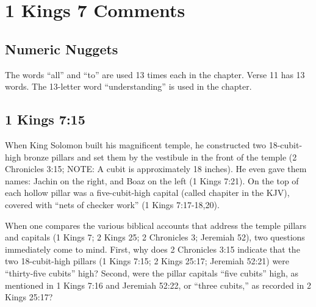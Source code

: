 \section{1 Kings 7 Comments}


\subsection{Numeric Nuggets}
The words ``all'' and ``to'' are used 13 times each in the chapter. Verse 11 has 13 words. The 13-letter word ``understanding'' is used in the chapter.



\subsection{1 Kings 7:15}
When King Solomon built his magnificent temple, he constructed two 18-cubit-high bronze pillars and set them by the vestibule in the front of the temple (2 Chronicles 3:15; NOTE: A cubit is approximately 18 inches). He even gave them names: Jachin on the right, and Boaz on the left (1 Kings 7:21). On the top of each hollow pillar was a five-cubit-high capital (called chapiter in the KJV), covered with “nets of checker work”  (1 Kings 7:17-18,20).

When one compares the various biblical accounts that address the temple pillars and capitals (1 Kings 7; 2 Kings 25; 2 Chronicles 3; Jeremiah 52), two questions immediately come to mind. First, why does 2 Chronicles 3:15 indicate that the two 18-cubit-high pillars (1 Kings 7:15; 2 Kings 25:17; Jeremiah 52:21) were “thirty-five cubits” high? Second, were the pillar capitals “five cubits” high, as mentioned in 1 Kings 7:16 and Jeremiah 52:22, or “three cubits,” as recorded in 2 Kings 25:17?

